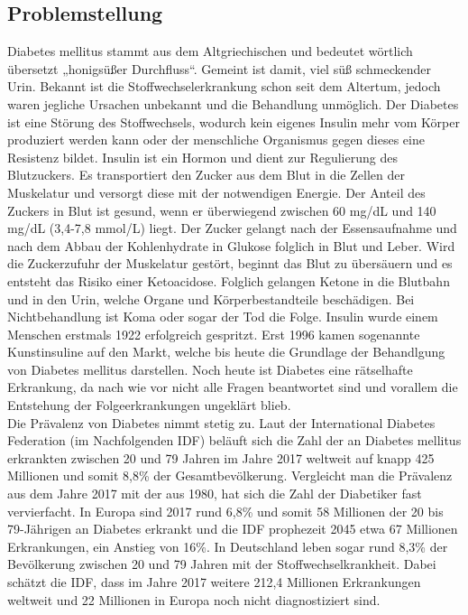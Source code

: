 \subsection{Problemstellung}
	Diabetes mellitus stammt aus dem Altgriechischen und bedeutet wörtlich übersetzt „honigsüßer Durchfluss“. Gemeint ist damit, viel süß schmeckender Urin. Bekannt ist die Stoffwechselerkrankung schon seit dem Altertum, jedoch waren jegliche Ursachen unbekannt und die Behandlung unmöglich. \newline 
	Der Diabetes ist eine Störung des Stoffwechsels, wodurch kein eigenes Insulin mehr vom Körper produziert werden kann oder der menschliche Organismus gegen dieses eine Resistenz bildet. Insulin ist ein Hormon und dient zur Regulierung des Blutzuckers. Es transportiert den Zucker aus dem Blut in die Zellen der Muskelatur und versorgt diese mit der notwendigen Energie. Der Anteil des Zuckers in Blut ist gesund, wenn er überwiegend zwischen 60 mg/dL und  140 mg/dL (3,4-7,8 mmol/L) liegt. Der Zucker gelangt nach der Essensaufnahme und nach dem Abbau der Kohlenhydrate in Glukose folglich in Blut und Leber. Wird die Zuckerzufuhr der Muskelatur gestört, beginnt das Blut zu übersäuern und es entsteht das Risiko einer Ketoacidose. Folglich gelangen Ketone in die Blutbahn und in den Urin, welche Organe und Körperbestandteile beschädigen. Bei Nichtbehandlung ist Koma oder sogar der Tod die Folge. Insulin wurde einem Menschen erstmals 1922 erfolgreich gespritzt. Erst 1996 kamen sogenannte Kunstinsuline auf den Markt, welche bis heute die Grundlage der Behandlgung von Diabetes mellitus darstellen. \newline
	Noch heute ist Diabetes eine rätselhafte Erkrankung, da nach wie vor nicht alle Fragen beantwortet sind und vorallem die Entstehung der Folgeerkrankungen ungeklärt blieb. \cite{SG}\\
	Die Prävalenz von Diabetes nimmt stetig zu. Laut der International Diabetes Federation (im Nachfolgenden IDF) beläuft sich die Zahl der an Diabetes mellitus erkrankten zwischen 20 und 79 Jahren im Jahre 2017 weltweit auf knapp 425 Millionen 
	und somit 8,8\% der Gesamtbevölkerung. Vergleicht man die Prävalenz aus dem Jahre 2017 mit der aus 1980, hat sich die Zahl der Diabetiker fast vervierfacht.\cite[S. 9]{IDF}\newline
	In Europa sind 2017 rund 6,8\% und somit 58 Millionen der 20 bis 79-Jährigen an Diabetes erkrankt und die IDF prophezeit 2045 etwa 67 Millionen Erkrankungen, ein Anstieg von 16\%. In Deutschland leben sogar rund 8,3\% der Bevölkerung zwischen 20 und 79 Jahren mit der Stoffwechselkrankheit. Dabei schätzt die IDF, dass im Jahre 2017 weitere 212,4 Millionen Erkrankungen weltweit und 22 Millionen in Europa noch nicht diagnostiziert sind.\cite[S. 110 ff.]{IDF}\newline
